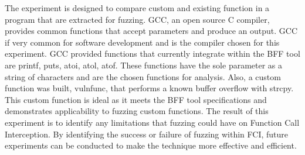 \documentclass[conference]{IEEEtran}
\begin{document}

The experiment is designed to compare custom and existing function in a program that are extracted for fuzzing. GCC, an open source C compiler, provides common functions that accept parameters and produce an output. GCC if very common for software development and is the compiler chosen for this experiment. GCC provided functions that currently integrate within the BFF tool are printf, puts, atoi, atol, atof. These functions have the sole parameter as a string of characters and are the chosen functions for analysis. Also, a custom function was built, vulnfunc, that performs a known buffer overflow with strcpy. This custom function is ideal as it meets the BFF tool specifications and demonstrates applicability to fuzzing custom functions. The result of this experiment is to identify any limitations that fuzzing could have on Function Call Interception.  By identifying the success or failure of fuzzing within FCI, future experiments can be conducted to make the technique more effective and efficient. 
\end{document}
